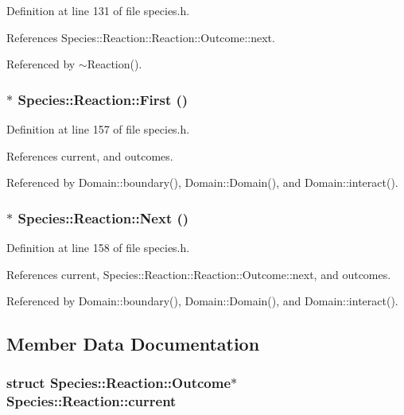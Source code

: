 Definition at line 131 of file species.h.

References Species::Reaction::Reaction::Outcome::next.

Referenced by $\sim$Reaction().\hypertarget{structSpecies_1_1Reaction_5650db946162048690bf038523a7faaa}{
\subsubsection[{First}]{$\ast$ Species::Reaction::First ()}}
\label{structSpecies_1_1Reaction_5650db946162048690bf038523a7faaa}




Definition at line 157 of file species.h.

References current, and outcomes.

Referenced by Domain::boundary(), Domain::Domain(), and Domain::interact().\hypertarget{structSpecies_1_1Reaction_f07ac4b72739ce571d967558d96d0940}{
\subsubsection[{Next}]{$\ast$ Species::Reaction::Next ()}}
\label{structSpecies_1_1Reaction_f07ac4b72739ce571d967558d96d0940}




Definition at line 158 of file species.h.

References current, Species::Reaction::Reaction::Outcome::next, and outcomes.

Referenced by Domain::boundary(), Domain::Domain(), and Domain::interact().

\subsection{Member Data Documentation}
\hypertarget{structSpecies_1_1Reaction_55dc123c04036012bffc584ff41bc046}{
\subsubsection[{current}]{\setlength{\rightskip}{0pt plus 5cm}struct {\bf Species::Reaction::Outcome}$\ast$ {\bf Species::Reaction::current}}}
\label{structSpecies_1_1Reaction_55dc123c04036012bffc584ff41bc046}


